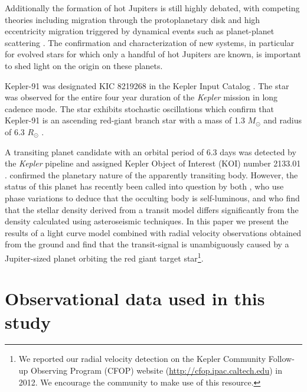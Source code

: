 \documentclass[apjl]{emulateapj}
\begin{document}
Additionally the formation of hot Jupiters is still highly debated, with competing theories including migration through the protoplanetary disk \citep{lin96} and high eccentricity migration triggered by dynamical events such as planet-planet scattering \citep{nagasawa08}. The confirmation and characterization of new systems, in particular for evolved stars for which only a handful of hot Jupiters are known, is important to shed light on the origin on these planets.

Kepler-91 was designated KIC 8219268  in the Kepler Input Catalog \citep{brown11}. The star was observed for the entire four year duration of the \emph{Kepler} mission in long cadence mode. The star exhibits stochastic oscillations which confirm that Kepler-91 is an ascending red-giant branch star with a mass of 1.3 $M_\odot$ and radius of 6.3 $R_\odot$ \citep{huber13,lillo14}.



A transiting planet candidate with an orbital period of 6.3 days was detected by the \emph{Kepler} pipeline \citep{jenkins10,tenenbaum13} and assigned Kepler Object of Interest (KOI) number 2133.01 \citep{batalha12}. \citet{lillo14} confirmed the planetary nature of the apparently transiting body. However, the status of this planet has recently been called into question by both \citet{esteves13}, who use phase variations to deduce that the occulting body is self-luminous, and \citet{sliski14} who find that the stellar density derived from a transit model differs significantly from the density calculated using asteroseismic techniques. In this paper we present the results of a light curve model combined with radial velocity observations obtained from the ground and find that the transit-signal is unambiguously caused by a Jupiter-sized planet orbiting the red giant target star\footnote{We reported our radial velocity detection on the Kepler Community Follow-up Observing Program (CFOP) website (\url{http://cfop.ipac.caltech.edu}) in 2012. We encourage the community to make use of this resource.}.


\section{Observational data used in this study}
\end{document}
